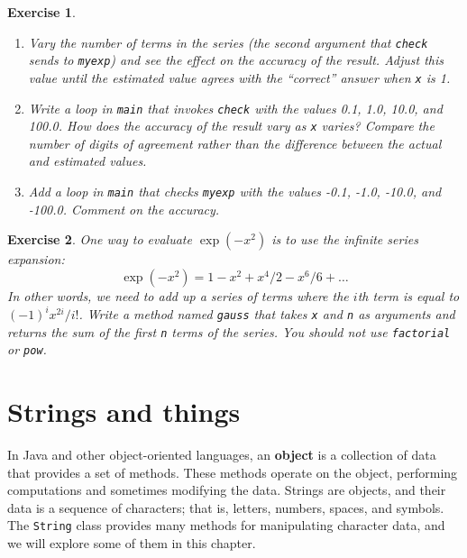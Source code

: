 \documentclass[12pt]{book}
\theoremstyle{exercise}
\newtheorem{exercise}{Exercise}[chapter]
\newcommand{\java}[1]{\verb"#1"}
\newcommand{\java}[1]{\lstinline{#1}} %
\begin{document}
\begin{exercise}
\begin{enumerate}
\item Vary the number of terms in the series (the second argument that \java{check} sends to \java{myexp}) and see the effect on
the accuracy of the result.
Adjust this value until the estimated value agrees with the ``correct'' answer when \java{x} is 1.

\item Write a loop in \java{main} that invokes \java{check} with the values 0.1, 1.0, 10.0, and 100.0.
How does the accuracy of the result vary as \java{x} varies?
Compare the number of digits of agreement rather than the difference between the actual and estimated values.

\item Add a loop in \java{main} that checks \java{myexp} with the values -0.1, -1.0, -10.0, and -100.0.
Comment on the accuracy.

\end{enumerate}

\end{exercise}


\begin{exercise}

One way to evaluate $\exp(-x^2)$ is to use the infinite series expansion:
%
\[ \exp(-x^2) = 1 - x^2 + x^4/2 - x^6/6 + \ldots \]
%
In other words, we need to add up a series of terms where the $i$th term is equal to $(-1)^i x^{2i} / i!$.
Write a method named \java{gauss} that takes \java{x} and \java{n} as arguments and returns the sum of the first \java{n} terms of the series.
You should not use \java{factorial} or \java{pow}.

\end{exercise}


\chapter{Strings and things}
\label{strings}


In Java and other object-oriented languages, an {\bf object} is a collection of data that provides a set of methods.
These methods operate on the object, performing computations and sometimes modifying the data.
Strings are objects, and their data is a sequence of characters; that is,
letters, numbers, spaces, and symbols.
The \java{String} class provides many methods for manipulating character data, and we will explore some of them in this chapter.
\end{document}
